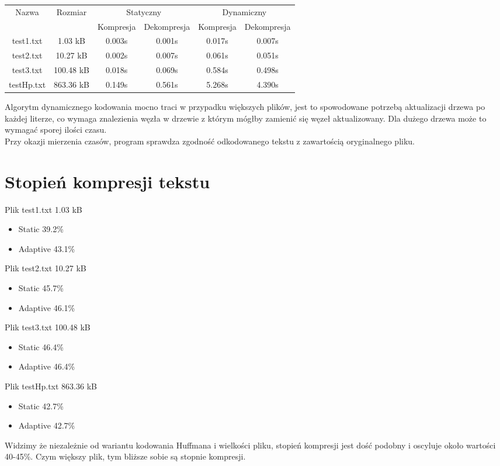 \documentclass{article}
\begin{document}
	\begin{center}
	\begin{tabular}{|c|c|c|c|c|c|}
	\hline
	\multirow{2}{*}{Nazwa} & \multirow{2}{*}{Rozmiar} & \multicolumn{2}{|c|}{Statyczny} & \multicolumn{2}{|c|}{Dynamiczny}\\
	\cline{3-6}
	& & Kompresja & Dekompresja & Kompresja & Dekompresja\\
	\hline
	test1.txt & 1.03 kB & 0.003s & 0.001s & 0.017s & 0.007s\\
	\hline
	test2.txt & 10.27 kB & 0.002s & 0.007s & 0.061s & 0.051s\\
	\hline
	test3.txt & 100.48 kB & 0.018s & 0.069s & 0.584s & 0.498s\\
	\hline
	testHp.txt & 863.36 kB & 0.149s & 0.561s & 5.268s & 4.390s\\
	\hline
	\end{tabular}
	\end{center}
	Algorytm dynamicznego kodowania mocno traci w przypadku większych plików, jest to spowodowane potrzebą aktualizacji drzewa po każdej literze, co wymaga znalezienia węzła w drzewie z którym mógłby zamienić się węzeł aktualizowany. Dla dużego drzewa może to wymagać sporej ilości czasu. \\[3mm]
	Przy okazji mierzenia czasów, program sprawdza zgodność odkodowanego tekstu z zawartością oryginalnego pliku.
\section{Stopień kompresji tekstu}
	Plik test1.txt 1.03 kB
	\begin{itemize}
	\item Static 39.2\%
	\item Adaptive 43.1\%
	\end{itemize}
	Plik test2.txt 10.27 kB
	\begin{itemize}
	\item Static 45.7\%
	\item Adaptive 46.1\%
	\end{itemize}
	Plik test3.txt 100.48 kB
	\begin{itemize}
	\item Static 46.4\%
	\item Adaptive 46.4\%
	\end{itemize}
	Plik testHp.txt 863.36 kB
	\begin{itemize}
	\item Static 42.7\%
	\item Adaptive 42.7\%
	\end{itemize}
	Widzimy że niezależnie od wariantu kodowania Huffmana i wielkości pliku, stopień kompresji jest dość podobny i oscyluje około wartości 40-45\%. Czym większy plik, tym bliższe sobie są stopnie kompresji.
\end{document}
